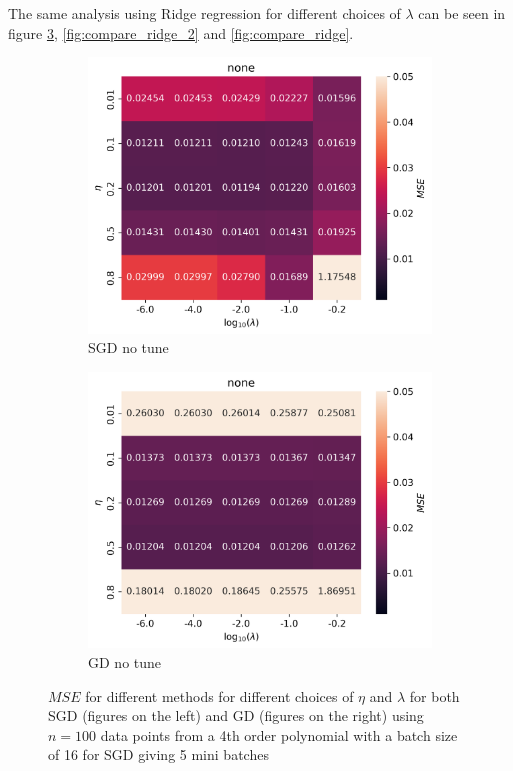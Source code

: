 \documentclass[11pt]{article}
\begin{document}
The same analysis using Ridge regression for different choices of $\lambda$ can be seen in figure \ref{fig:compare_ridge_1}, \ref{fig:compare_ridge_2} and \ref{fig:compare_ridge}.
\begin{figure}[H]
    \begin{subfigure}{.5\textwidth}
        \centering
        \includegraphics[width=\textwidth]{../figures/none_SGD_eta_lmb.png}
        \caption{SGD no tune}
        \label{fig:}
    \end{subfigure}
    \begin{subfigure}{.5\textwidth}
        \centering
        \includegraphics[width=\textwidth]{../figures/none_GD_eta_lmb.png}
        \caption{GD no tune}
        \label{fig:}
    \end{subfigure}
    \caption{$MSE$ for different methods for different choices of $\eta$ and $\lambda$ for both SGD (figures on the left) and GD (figures on the right) using $n=100$ data points from a 4th order polynomial with a batch size of 16 for SGD giving 5 mini batches}
    \label{fig:compare_ridge_1}
\end{figure}
\end{document}
